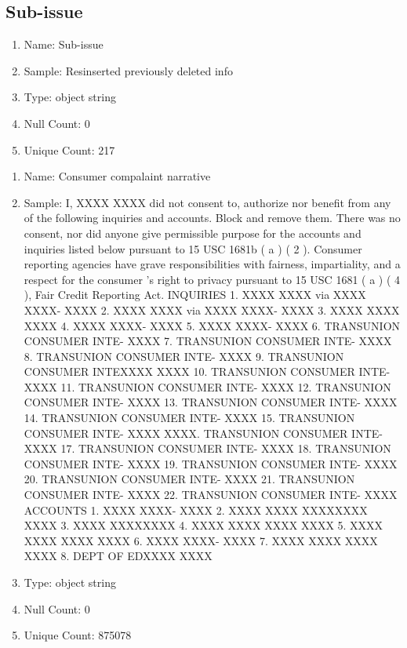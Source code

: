 \documentclass{article}
\begin{document}
\subsection{Sub-issue}
\begin{enumerate}
\item Name: Sub-issue
\item Sample: Resinserted previously deleted info
\item Type: object string
\item Null Count: 0
\item Unique Count: 217
\end{enumerate}

\begin{enumerate}
\item Name: Consumer compalaint narrative
\item Sample: 
I, XXXX XXXX did not consent to, authorize nor benefit from any of the following inquiries and accounts. Block and remove them. There was no consent, nor did anyone give permissible purpose for the accounts and inquiries listed below pursuant to 15 USC 1681b ( a ) ( 2 ). Consumer reporting agencies have grave responsibilities with fairness, impartiality, and a respect for the consumer 's right to privacy pursuant to 15 USC 1681 ( a ) ( 4 ), Fair Credit Reporting Act. INQUIRIES 1. XXXX XXXX via XXXX XXXX- XXXX 2. XXXX XXXX via XXXX XXXX- XXXX 3. XXXX XXXX  XXXX 4. XXXX XXXX- XXXX 5. XXXX XXXX- XXXX 6. TRANSUNION CONSUMER INTE- XXXX 7. TRANSUNION CONSUMER INTE-  XXXX 8. TRANSUNION CONSUMER INTE- XXXX 9. TRANSUNION CONSUMER INTEXXXX XXXX 10. TRANSUNION CONSUMER INTE-  XXXX 11. TRANSUNION CONSUMER INTE-  XXXX 12. TRANSUNION CONSUMER INTE-  XXXX 13. TRANSUNION CONSUMER INTE- XXXX 14. TRANSUNION CONSUMER INTE- XXXX 15. TRANSUNION CONSUMER INTE- XXXX XXXX. TRANSUNION CONSUMER INTE- XXXX 17. TRANSUNION CONSUMER INTE- XXXX 18. TRANSUNION CONSUMER INTE- XXXX 19. TRANSUNION CONSUMER INTE- XXXX 20. TRANSUNION CONSUMER INTE- XXXX 21. TRANSUNION CONSUMER INTE- XXXX 22. TRANSUNION CONSUMER INTE- XXXX ACCOUNTS 1. XXXX XXXX- XXXX 2. XXXX XXXX XXXXXXXX XXXX 3. XXXX XXXXXXXX 4. XXXX XXXX XXXX XXXX 5. XXXX XXXX XXXX XXXX 6. XXXX XXXX- XXXX 7. XXXX XXXX XXXX XXXX 8. DEPT OF EDXXXX XXXX
\item Type: object string
\item Null Count: 0
\item Unique Count: 875078
\end{enumerate}
\end{document}
